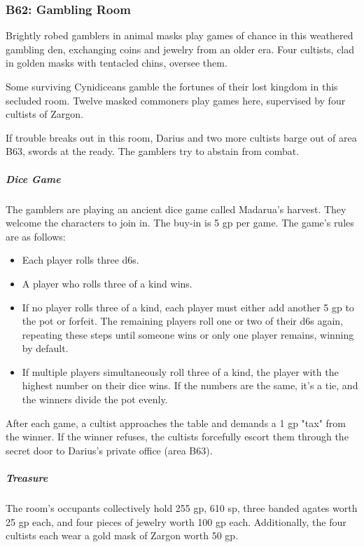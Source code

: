 \documentclass[10pt,a4paper,twoside,bg=print,twocolumn,openany,nodeprecatedcode]{dndbook}
\begin{document}
\subsubsection{B62: Gambling Room}
\begin{DndReadAloud}{}
Brightly robed gamblers in animal masks play games of chance in this weathered gambling den, exchanging coins and jewelry from an older era. Four cultists, clad in golden masks with tentacled chins, oversee them.

\end{DndReadAloud}

Some surviving Cynidiceans gamble the fortunes of their lost kingdom in this secluded room. Twelve masked commoners play games here, supervised by four cultists of Zargon.

If trouble breaks out in this room, Darius and two more cultists barge out of area B63, swords at the ready. The gamblers try to abstain from combat.

\subparagraph{Dice Game}
The gamblers are playing an ancient dice game called Madarua's harvest. They welcome the characters to join in. The buy-in is 5 gp per game. The game's rules are as follows:


\begin{itemize}
\item Each player rolls three d6s.
\item A player who rolls three of a kind wins.
\item If no player rolls three of a kind, each player must either add another 5 gp to the pot or forfeit. The remaining players roll one or two of their d6s again, repeating these steps until someone wins or only one player remains, winning by default.
\item If multiple players simultaneously roll three of a kind, the player with the highest number on their dice wins. If the numbers are the same, it's a tie, and the winners divide the pot evenly.
\end{itemize}

After each game, a cultist approaches the table and demands a 1 gp "tax" from the winner. If the winner refuses, the cultists forcefully escort them through the secret door to Darius's private office (area B63).

\subparagraph{Treasure}
The room's occupants collectively hold 255 gp, 610 sp, three banded agates worth 25 gp each, and four pieces of jewelry worth 100 gp each. Additionally, the four cultists each wear a gold mask of Zargon worth 50 gp.
\end{document}
